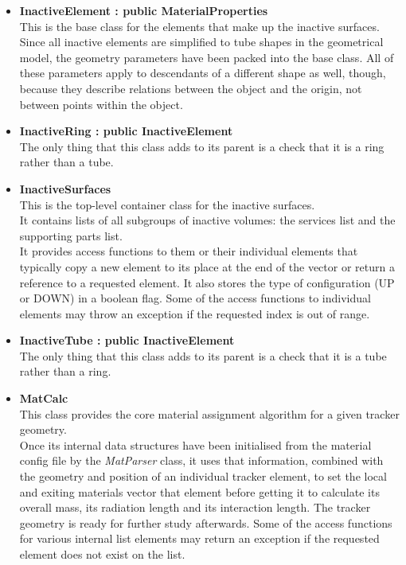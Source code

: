 \documentclass[12pt, a4paper]{article}
\begin{document}
\begin{itemize}
\item \textbf{InactiveElement : public MaterialProperties}\\
This is the base class for the elements that make up the inactive surfaces.\\
Since all inactive elements are simplified to tube shapes in the geometrical model, the geometry parameters have been packed into the base class. All of these parameters apply to descendants of a different shape as well, though, because they describe relations between the object and the origin, not between points within the object.

\item \textbf{InactiveRing : public InactiveElement}\\
The only thing that this class adds to its parent is a check that it is a ring rather than a tube.

\item \textbf{InactiveSurfaces}\\
This is the top-level container class  for the inactive surfaces.\\
It contains lists of all subgroups of inactive volumes: the services list and the supporting parts list.\\
It provides access functions to them or their individual elements that typically copy a new element to its place at the end of the vector or return a reference to a requested element. It also stores the type of configuration (UP or DOWN) in a boolean flag. Some of the access functions to individual elements may throw an exception if the requested index is out of range.

\item \textbf{InactiveTube : public InactiveElement}\\
The only thing that this class adds to its parent is a check that it is a tube rather than a ring.

\item \textbf{MatCalc}\\
This class provides the core material assignment algorithm for a given tracker geometry.\\
Once its internal data structures have been initialised from the material config file by the \emph{MatParser} class, it uses that information, combined with the geometry and position of an individual tracker element, to set the local and exiting materials vector that element before getting it to calculate its overall mass, its radiation length and its interaction length. The tracker geometry is ready for further study afterwards. Some of the access functions for various internal list elements may return an exception if the requested element does not exist on the list.

\end{itemize}
\end{document}
